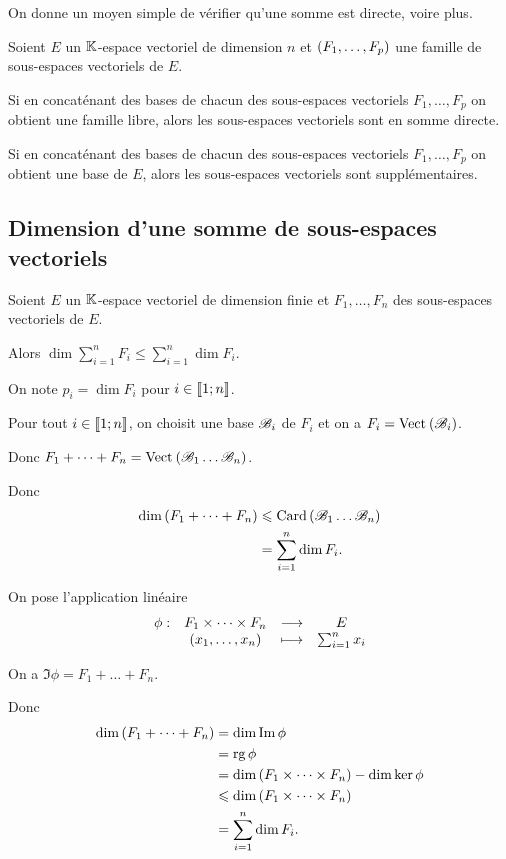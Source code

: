 On donne un moyen simple de vérifier qu'une somme est directe, voire plus.

\begin{prop}
Soient \(E\) un \(\mathbb{K}\)-espace vectoriel de dimension \(n\) et \(\left(F_1,\dots,F_p\right)\) une famille de sous-espaces vectoriels de \(E\).

Si en concaténant des bases de chacun des sous-espaces vectoriels \(F_1,\dots,F_p\) on obtient une famille libre, alors les sous-espaces vectoriels sont en somme directe.

Si en concaténant des bases de chacun des sous-espaces vectoriels \(F_1,\dots,F_p\) on obtient une base de \(E\), alors les sous-espaces vectoriels sont supplémentaires.
\end{prop}

\subsection{Dimension d'une somme de sous-espaces vectoriels}

\begin{prop}
Soient \(E\) un \(\mathbb{K}\)-espace vectoriel de dimension finie et \(F_1,\dots,F_n\) des sous-espaces vectoriels de \(E\).

Alors \(\dim\sum_{i=1}^nF_i\leq\sum_{i=1}^n\dim F_i\).
\end{prop}

\begin{dem}
On note \(p_i=\dim F_i\) pour \(i\in\left\llbracket1;n\right\rrbracket\).

Pour tout \(i\in\left\llbracket1;n\right\rrbracket\), on choisit une base \(\mathscr{B}_i\) de \(F_i\) et on a \(F_i=\Vect{\fami{B}_i}\).

Donc \(F_1+\dots+F_n=\Vect{\fami{B}_1\dots\fami{B}_n}\).

Donc \[\begin{aligned}
\dim\left(F_1+\dots+F_n\right)&\leqslant\operatorname{Card}\left(\mathscr{B}_1\dots\mathscr{B}_n\right) \\
&=\sum_{i=1}^n\dim F_i.
\end{aligned}\]
\end{dem}

\begin{dem}
On pose l'application linéaire \[\begin{array}[t]{cccc}\phi : & F_1\times\dots\times F_n & \longrightarrow & E \\ & \left(x_1,\dots,x_n\right) & \longmapsto & \sum_{i=1}^nx_i\end{array}\]

On a \(\Im\phi=F_1+\dots+F_n\).

Donc \[\begin{aligned}
\dim\left(F_1+\dots+F_n\right)&=\dim\operatorname{Im}\phi \\
&=\operatorname{rg}\phi \\
&=\dim\left(F_1\times\dots\times F_n\right)-\dim\ker\phi \\
&\leqslant\dim\left(F_1\times\dots\times F_n\right) \\
&=\sum_{i=1}^n\dim F_i.
\end{aligned}\]
\end{dem}

